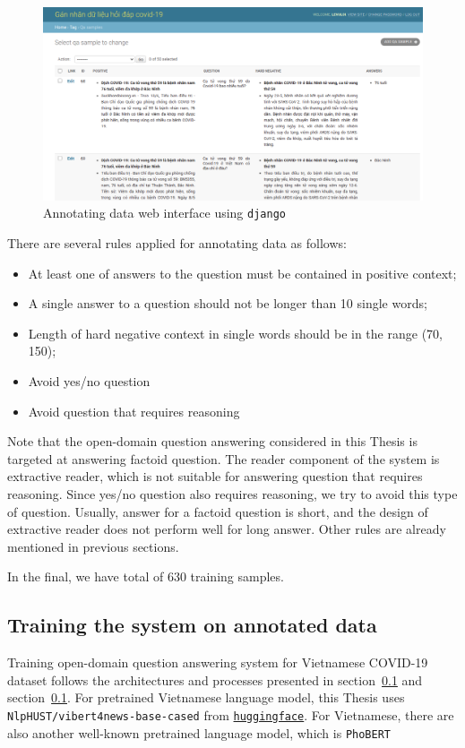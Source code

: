 \documentclass[12pt, sort&compress]{report}
\begin{document}
\begin{figure}[!htbp]
	\centering
	\includegraphics[scale=.3]{images/annotate.png}
	\caption{Annotating data web interface using {\tt django}}
	\label{fig:10}
\end{figure}
There are several rules applied for annotating data as follows:
\begin{itemize}
	\item At least one of answers to the question must be contained in positive context;
	\item A single answer to a question should not be longer than 10 single words;
	\item Length of hard negative context in single words should be in the range (70, 150);
	\item Avoid yes/no question
	\item Avoid question that requires reasoning
\end{itemize}
Note that the open-domain question answering considered in this Thesis is targeted at answering factoid question. The reader component of the system is extractive reader, which is not suitable for answering question that requires reasoning. Since yes/no question also requires reasoning, we try to avoid this type of question. Usually, answer for a factoid question is short, and the design of extractive reader does not perform well for long answer. Other rules are already mentioned in previous sections.
\par In the final, we have total of 630 training samples. 
\subsection{Training the system on annotated data}
Training open-domain question answering system for Vietnamese COVID-19 dataset follows the architectures and processes presented in section~\ref{} and section~\ref{}. For pretrained Vietnamese language model, this Thesis uses {\tt NlpHUST/vibert4news-base-cased} from \href{https://huggingface.co/}{\tt huggingface}. For Vietnamese, there are also another well-known pretrained language model, which is {\tt PhoBERT} \cite{nguyen2020phobert}
\end{document}
